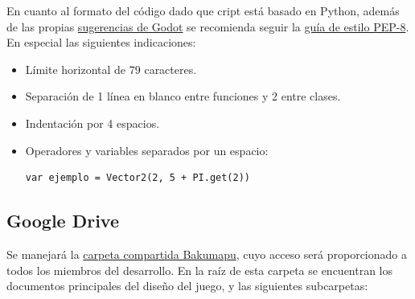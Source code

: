 En cuanto al formato del código dado que cript está basado en Python, además de las propias \href{https://docs.godotengine.org/en/stable/getting_started/scripting/gdscript/gdscript_styleguide.html}{sugerencias de Godot} se recomienda seguir la \href{https://www.python.org/dev/peps/pep-0008/}{guía de estilo PEP-8}. En especial las siguientes indicaciones:

\begin{itemize}[noitemsep]
	\item Límite horizontal de 79 caracteres. 
	\item Separación de 1 línea en blanco entre funciones y 2 entre clases.
	\item Indentación por 4 espacios.
	\item Operadores y variables separados por un espacio:
	\begin{lstlisting}
var ejemplo = Vector2(2, 5 + PI.get(2))
	\end{lstlisting}
\end{itemize}


\subsection{Google Drive}\label{flujo:google-drive}
Se manejará la \href{https://drive.google.com/open?id=1p8u-1UpXts8OHGRHEZLSIiQrqqx0Y4Kt}{carpeta compartida Bakumapu}, cuyo acceso será proporcionado a todos los miembros del desarrollo. En la raíz de esta carpeta se encuentran los documentos principales del diseño del juego, y las siguientes subcarpetas:

